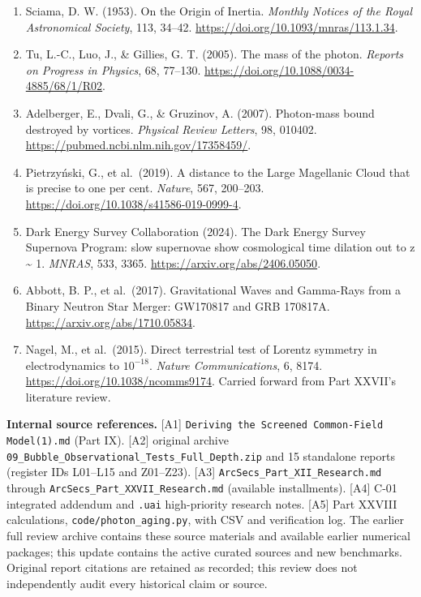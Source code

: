 \documentclass[
  11pt,
  twoside]{article}
\providecommand{\tightlist}{%
  \setlength{\itemsep}{0pt}\setlength{\parskip}{0pt}}
\begin{document}
\begin{enumerate}
\def\labelenumi{\arabic{enumi}.}
\tightlist
\item
  Sciama, D. W. (1953). On the Origin of Inertia. \emph{Monthly Notices
  of the Royal Astronomical Society}, 113, 34--42.
  \url{https://doi.org/10.1093/mnras/113.1.34}.
\item
  Tu, L.-C., Luo, J., \& Gillies, G. T. (2005). The mass of the photon.
  \emph{Reports on Progress in Physics}, 68, 77--130.
  \url{https://doi.org/10.1088/0034-4885/68/1/R02}.
\item
  Adelberger, E., Dvali, G., \& Gruzinov, A. (2007). Photon-mass bound
  destroyed by vortices. \emph{Physical Review Letters}, 98, 010402.
  \url{https://pubmed.ncbi.nlm.nih.gov/17358459/}.
\item
  Pietrzyński, G., et al.~(2019). A distance to the Large Magellanic
  Cloud that is precise to one per cent. \emph{Nature}, 567, 200--203.
  \url{https://doi.org/10.1038/s41586-019-0999-4}.
\item
  Dark Energy Survey Collaboration (2024). The Dark Energy Survey
  Supernova Program: slow supernovae show cosmological time dilation out
  to z \textasciitilde{} 1. \emph{MNRAS}, 533, 3365.
  \url{https://arxiv.org/abs/2406.05050}.
\item
  Abbott, B. P., et al.~(2017). Gravitational Waves and Gamma-Rays from
  a Binary Neutron Star Merger: GW170817 and GRB 170817A.
  \url{https://arxiv.org/abs/1710.05834}.
\item
  Nagel, M., et al.~(2015). Direct terrestrial test of Lorentz symmetry
  in electrodynamics to \(10^{-18}\). \emph{Nature Communications}, 6,
  8174. \url{https://doi.org/10.1038/ncomms9174}. Carried forward from
  Part XXVII's literature review.
\end{enumerate}

\textbf{Internal source references.} {[}A1{]}
\nolinkurl{Deriving the Screened Common-Field Model(1).md} (Part IX).
{[}A2{]} original archive
\nolinkurl{09_Bubble_Observational_Tests_Full_Depth.zip} and 15
standalone reports (register IDs L01--L15 and Z01--Z23). {[}A3{]}
\nolinkurl{ArcSecs_Part_XII_Research.md} through
\nolinkurl{ArcSecs_Part_XXVII_Research.md} (available installments).
{[}A4{]} C-01 integrated addendum and \texttt{.uai} high-priority
research notes. {[}A5{]} Part XXVIII calculations,
\nolinkurl{code/photon_aging.py}, with CSV and verification log. The
earlier full review archive contains these source materials and
available earlier numerical packages; this update contains the active
curated sources and new benchmarks. Original report citations are
retained as recorded; this review does not independently audit every
historical claim or source.
\end{document}

